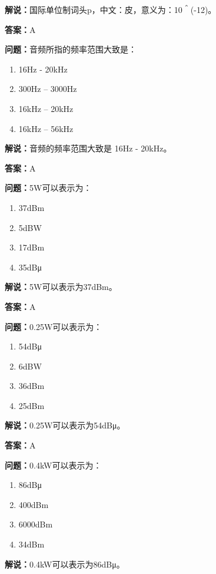 \textbf{解说：}国际单位制词头p，中文：皮，意义为：10＾(-12)。

\textbf{答案：}A

\textbf{问题：}音频所指的频率范围大致是：

\begin{enumerate}[label=\Alph*), leftmargin=3em]
	\item 16Hz - 20kHz
	\item 300Hz – 3000Hz
	\item 16kHz – 20kHz
	\item 16kHz – 56kHz
\end{enumerate}

\textbf{解说：}音频的频率范围大致是 16Hz - 20kHz。%

\textbf{答案：}A

\textbf{问题：}5W可以表示为：

\begin{enumerate}[label=\Alph*), leftmargin=3em]
	\item 37dBm
	\item 5dBW
	\item 17dBm
	\item 35dBμ
\end{enumerate}

\textbf{解说：}5W可以表示为37dBm。 %

\textbf{答案：}A

\textbf{问题：}0.25W可以表示为：

\begin{enumerate}[label=\Alph*), leftmargin=3em]
	\item 54dBμ
	\item 6dBW
	\item 36dBm
	\item 25dBm
\end{enumerate}

\textbf{解说：}0.25W可以表示为54dBμ。%

\textbf{答案：}A

\textbf{问题：}0.4kW可以表示为：

\begin{enumerate}[label=\Alph*), leftmargin=3em]
	\item 86dBμ
	\item 400dBm
	\item 6000dBm
	\item 34dBm
\end{enumerate}

\textbf{解说：}0.4kW可以表示为86dBμ。%

